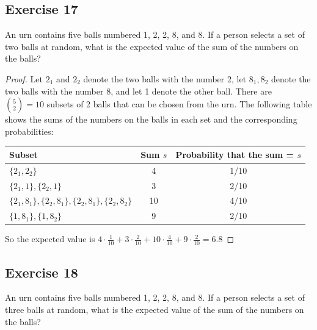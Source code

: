 \documentclass[14pt]{extarticle}
\begin{document}
\subsection{Exercise 17}
An urn contains five balls numbered 1, 2, 2, 8, and 8. If a person selects a set of two balls at random, what is the 
expected value of the sum of the numbers on the balls?

\begin{proof}
Let \(2_1\) and \(2_2\) denote the two balls with the number 2, let \(8_1, 8_2\) denote the two balls with the number 8, 
and let 1 denote the other ball. There are \(\binom{5}{2} = 10\) subsets of 2 balls that can be chosen from the urn. The 
following table shows the sums of the numbers on the balls in each set and the corresponding probabilities:
\begin{center}
\begin{tabular}{|l|c|c|}
\hline
{\bf Subset} & {\bf Sum \(s\)} & {\bf Probability that the sum = \(s\)} \\
\hline
\(\{2_1, 2_2\}\) & 4 & 1/10 \\
\hline
\(\{2_1,1\}, \{2_2,1\}\) & 3 & 2/10 \\
\hline
\(\{2_1,8_1\}, \{2_2,8_1\}, \{2_2,8_1\}, \{2_2,8_2\}\) & 10 & 4/10 \\
\hline
\(\{1,8_1\}, \{1,8_2\}\) & 9 & 2/10 \\
\hline
\end{tabular}
\end{center}
So the expected value is \(4 \cdot \frac{1}{10} + 3 \cdot \frac{2}{10} + 10 \cdot \frac{4}{10} + 9 \cdot \frac{2}{10} = 
6.8\)
\end{proof}

\subsection{Exercise 18}
An urn contains five balls numbered 1, 2, 2, 8, and 8. If a person selects a set of three balls at random, what is the 
expected value of the sum of the numbers on the balls?
\end{document}

